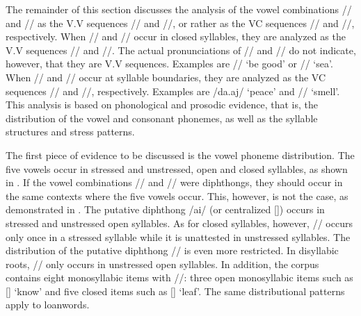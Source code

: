 \newpage 
The remainder of this section discusses the analysis of the vowel combinations // and // as the V.V sequences // and //, or rather as the VC sequences // and //, respectively. When // and // occur in closed syllables, they are analyzed as the V.V sequences // and //. The actual pronunciations of // and // do not indicate, however, that they are V.V sequences. Examples are  // ‘be good’ or  // ‘sea’. When // and // occur at syllable boundaries, they are analyzed as the VC sequences // and //, respectively. Examples are  /da.aj/ ‘peace’ and  // ‘smell’. This analysis is based on phonological and prosodic evidence, that is, the distribution of the vowel and consonant phonemes, as well as the syllable structures and stress patterns.

 
The first piece of evidence to be discussed is the vowel phoneme distribution. The five vowels occur in stressed and unstressed, open and closed syllables, as shown in . If the vowel combinations // and // were diphthongs, they should occur in the same contexts where the five vowels occur. This, however, is not the case, as demonstrated in . The putative diphthong /ai/ (or centralized []) occurs in stressed and unstressed open syllables. As for closed syllables, however, // occurs only once in a stressed syllable while it is unattested in unstressed syllables. The distribution of the putative diphthong // is even more restricted. In disyllabic roots, // only occurs in unstressed open syllables. In addition, the corpus contains eight monosyllabic items with //: three open monosyllabic items such as [] ‘know’ and five closed items such as [] ‘leaf’. The same distributional patterns apply to loanwords.

